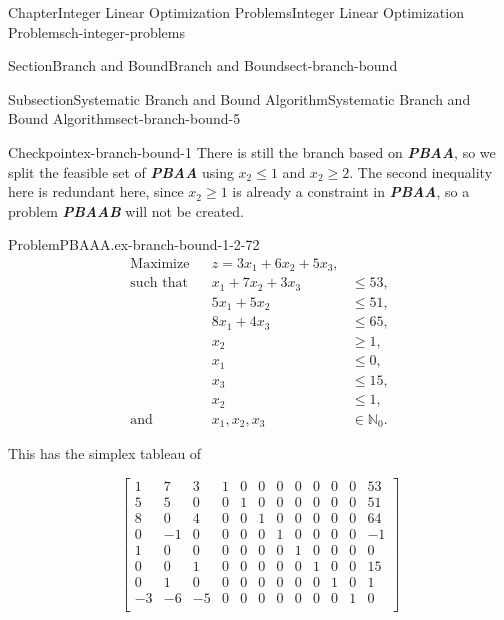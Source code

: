 \documentclass[oneside,10pt,]{book}
\newcommand{\alert}[1]{\textbf{\textit{#1}}}
\numberwithin{equation}{section}
\newcommand{\amp}{&}
\begin{document}
\begin{chapterptx}{Chapter}{Integer Linear Optimization Problems}{}{Integer Linear Optimization Problems}{}{}{ch-integer-problems}
\begin{sectionptx}{Section}{Branch and Bound}{}{Branch and Bound}{}{}{sect-branch-bound}
\begin{subsectionptx}{Subsection}{Systematic Branch and Bound Algorithm}{}{Systematic Branch and Bound Algorithm}{}{}{sect-branch-bound-5}
\begin{inlineexercise}{Checkpoint}{}{ex-branch-bound-1}
There is still the branch based on \alert{PBAA}, so we split the feasible set of \alert{PBAA} using \(x_2 \leq 1\) and \(x_2 \geq 2\). The second inequality here is redundant here, since \(x_2 \geq 1\) is already a constraint in \alert{PBAA}, so a problem \alert{PBAAB} will not be created.%
\begin{problem}{Problem}{PBAAA.}{ex-branch-bound-1-2-72}%
%
\begin{equation*}
\begin{aligned} \text{Maximize} \amp\amp z = 3x_1 +6x_2 + 5 x_3, \amp\\ \text{such that} \amp\amp x_1 + 7 x_2 + 3x_3 \amp \leq 53, \\ \amp\amp 5 x_1 + 5 x_2 \amp \leq 51, \\ \amp\amp 8 x_1 + 4x_3 \amp \leq 65, \\ \amp\amp x_2 \amp \geq 1, \\ \amp\amp x_1 \amp \leq 0, \\ \amp \amp x_3 \amp \leq 15, \\ \amp \amp x_2 \amp \leq 1, \\ \text{and} \amp\amp x_1, x_2, x_3 \amp \in \mathbb{N}_{0}.
\end{aligned}
\end{equation*}
%
\end{problem}
This has the simplex tableau of%
\par
%
\begin{equation*}
\left[\begin{array}{rrr|rrrrrrrr|r} 1 \amp 7 \amp 3 \amp 1 \amp 0 \amp 0 \amp 0 \amp 0 \amp 0 \amp 0 \amp 0 \amp 53\\ 5 \amp 5 \amp 0 \amp 0 \amp 1 \amp 0 \amp 0 \amp 0 \amp 0 \amp 0 \amp 0 \amp 51\\ 8 \amp 0 \amp 4 \amp 0 \amp 0 \amp 1 \amp 0 \amp 0 \amp 0 \amp 0 \amp 0 \amp 64\\ 0 \amp -1 \amp 0 \amp 0 \amp 0 \amp 0 \amp 1 \amp 0 \amp 0 \amp 0 \amp 0 \amp -1\\ 1 \amp 0 \amp 0 \amp 0 \amp 0 \amp 0 \amp 0 \amp 1 \amp 0 \amp 0 \amp 0 \amp 0\\ 0 \amp 0 \amp 1 \amp 0 \amp 0 \amp 0 \amp 0 \amp 0 \amp 1 \amp 0 \amp 0 \amp 15\\ 0 \amp 1 \amp 0 \amp 0 \amp 0 \amp 0 \amp 0 \amp 0 \amp 0 \amp 1 \amp 0 \amp 1\\ \hline -3 \amp -6 \amp -5 \amp 0 \amp 0 \amp 0 \amp 0 \amp 0 \amp 0 \amp 0 \amp 1 \amp 0\\ \end{array} \right]

\end{equation*}
\end{inlineexercise}
\end{subsectionptx}
\end{sectionptx}
\end{chapterptx}
\end{document}
